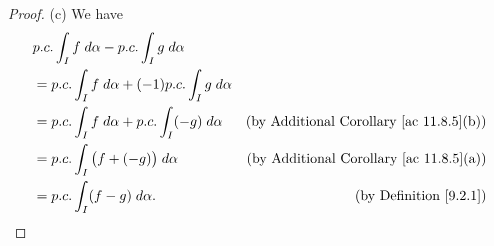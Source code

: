 \begin{proof}{(c)}
    We have
    \begin{align*}
         & p.c. \int_I f \; d \alpha - p.c. \int_I g \; d \alpha                                                              \\
         & = p.c. \int_I f \; d \alpha + (-1) p.c. \int_I g \; d \alpha                                                       \\
         & = p.c. \int_I f \; d \alpha + p.c. \int_I (-g) \; d \alpha   & \text{(by Additional Corollary \ref{ac 11.8.5}(b))} \\
         & = p.c. \int_I \big(f + (-g)\big) \; d \alpha                 & \text{(by Additional Corollary \ref{ac 11.8.5}(a))} \\
         & = p.c. \int_I (f - g) \; d \alpha.                           & \text{(by Definition \ref{9.2.1})}
    \end{align*}
\end{proof}

